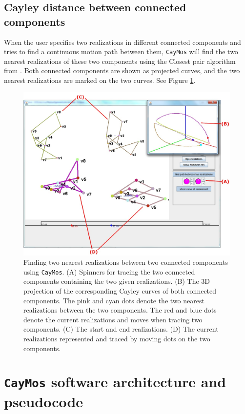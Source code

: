 \documentclass[10pt]{article}
\begin{document}
\subsection{Cayley distance between connected components}\label{subsec:distance}


When the user specifies two realizations in different connected components and
tries to find a continuous motion path between them, 
\texttt{CayMos} will
find the two nearest realizations of these two components using the Closest pair algorithm from \cite{sitharam2014beast}. 
Both connected components are shown as projected curves, 
and the two nearest realizations are marked on the two curves. 
See Figure \ref{fig:nopath}. 


\begin{figure}[hbtp]
\begin{center}
\includegraphics[width=.65\linewidth]{img/nopath}
\end{center}
\caption{Finding two nearest realizations between two connected components using \texttt{CayMos}.  
(A) Spinners for tracing the two connected components containing the two given realizations. 
(B) The 3D projection of the corresponding Cayley curves of both connected components. 
The pink and cyan dots denote the two nearest realizations between the two components. 
The red and blue dots denote the current realizations and moves when tracing two components. 
(C) The start and end realizations. 
(D) The current realizations represented and traced by moving dots on the two components. %
 }
\label{fig:nopath}
\end{figure}




\section{\texttt{CayMos} software architecture and pseudocode}
\end{document}

